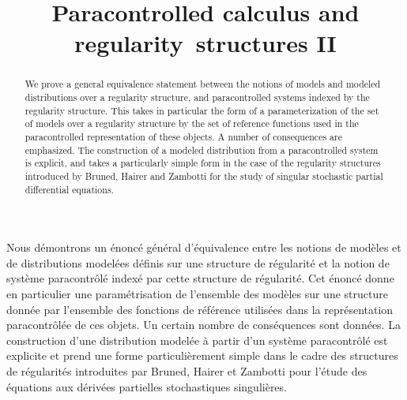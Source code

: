 \documentclass[JEP,XML,SOM,Unicode,published]{cedram}
\theoremstyle{plain}
\theoremstyle{definition}
\begin{document}
\frontmatter
\title{Paracontrolled calculus and regularity~structures II}

\author[\initial{I.} \lastname{Bailleul}]{ }
\address{Univ. Rennes, CNRS, IRMAR - UMR 6625\\
263 avenue du General Leclerc, 35042 Rennes, France}

\author[\initial{M.} \lastname{Hoshino}]{ }
\address{Graduate School of Engineering Science, Osaka University\\
1-3, Machikaneyama, Toyonaka, Osaka, 560-8531, Japan}

\begin{abstract}
We prove a general equivalence statement between the notions of models and modeled distributions over a regularity structure, and paracontrolled systems indexed by the regularity structure. This takes in particular the form of a parameterization of the set of models over a regularity structure by the set of reference functions used in the paracontrolled representation of these objects. A number of consequences are emphasized. The construction of a modeled distribution from a paracontrolled system is explicit, and takes a particularly simple form in the case of the regularity structures introduced by Bruned, Hairer and Zambotti for the study of singular stochastic partial differential equations.
\end{abstract}





\begin{altabstract}
Nous démontrons un énoncé général d'équivalence entre les notions de modèles et de distributions modelées définis sur une structure de régularité et la notion de système paracontrôlé indexé par cette structure de régularité. Cet énoncé donne en particulier une paramétrisation de l'ensemble des modèles sur une structure donnée par l'ensemble des fonctions de référence utilisées dans la représentation paracontrôlée de ces objets. Un certain nombre de conséquences sont données. La construction d'une distribution modelée à partir d'un système paracontrôlé est explicite et prend une forme particulièrement simple dans le cadre des structures de régularités introduites par Bruned, Hairer et Zambotti pour l'étude des équations aux dérivées partielles stochastiques singulières.
\end{altabstract}
\end{document}
